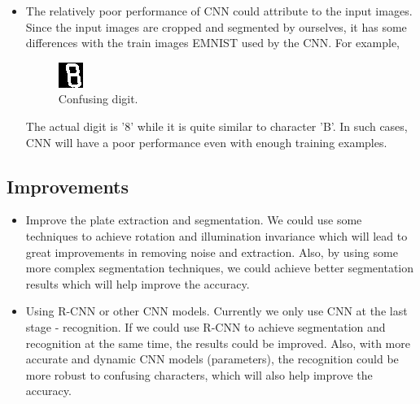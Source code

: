 \documentclass{article}
\begin{document}
\begin{spacing}{1.0}
\begin{itemize}
	\item The relatively poor performance of CNN could attribute to the input images. Since the input images are cropped and segmented by ourselves, it has some differences with the train images EMNIST used by the CNN. For example, 
	\begin{figure}[H]
		\begin{center}
			\includegraphics[scale=0.8]{confuse_digit.jpg}
			\caption{Confusing digit.}
		\end{center}
	\end{figure}
	The actual digit is '8' while it is quite similar to character 'B'. In such cases, CNN will have a poor performance even with enough training examples.
\end{itemize}

\subsection{Improvements}
\begin{itemize}
	\item Improve the plate extraction and segmentation. We could use some techniques to achieve rotation and illumination invariance which will lead to great improvements in removing noise and extraction. Also, by using some more complex segmentation techniques, we could achieve better segmentation results which will help improve the accuracy.
	
	\item Using R-CNN or other CNN models. Currently we only use CNN at the last stage - recognition. If we could use R-CNN to achieve segmentation and recognition at the same time, the results could be improved. Also, with more accurate and dynamic CNN models (parameters), the recognition could be more robust to confusing characters, which will also help improve the accuracy.
\end{itemize}














\end{spacing}

\end{document}
